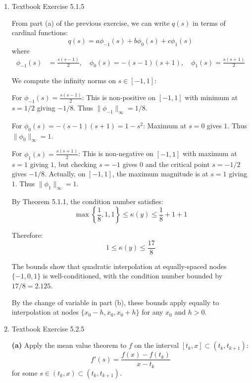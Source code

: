 \documentclass[reqno, answers]{exam}
\begin{document}
\begin{enumerate}
\begin{solution}
              Alternatively, in compact form:
              $$\tilde{q}(x) = \frac{(a-2b+c)(x-x_0)^2 + (c-a)h(x-x_0) + 2bh^2}{2h^2}$$
          \end{solution}

    \item Textbook Exercise 5.1.5
          \begin{solution}
              From part (a) of the previous exercise, we can write $q(s)$ in terms of cardinal functions:
              $$q(s) = a\phi_{-1}(s) + b\phi_0(s) + c\phi_1(s)$$
              where
              \begin{align*}
                  \phi_{-1}(s) & = \frac{s(s-1)}{2}, \quad \phi_0(s) = -(s-1)(s+1), \quad \phi_1(s) = \frac{s(s+1)}{2}
              \end{align*}

              We compute the infinity norms on $s \in [-1, 1]$:

              For $\phi_{-1}(s) = \frac{s(s-1)}{2}$: This is non-positive on $[-1,1]$ with minimum at $s=1/2$ giving $-1/8$. Thus $\|\phi_{-1}\|_\infty = 1/8$.

              For $\phi_0(s) = -(s-1)(s+1) = 1 - s^2$: Maximum at $s=0$ gives $1$. Thus $\|\phi_0\|_\infty = 1$.

              For $\phi_1(s) = \frac{s(s+1)}{2}$: This is non-negative on $[-1,1]$ with maximum at $s=1$ giving $1$, but checking $s=-1$ gives $0$ and the critical point $s=-1/2$ gives $-1/8$. Actually, on $[-1,1]$, the maximum magnitude is at $s=1$ giving $1$. Thus $\|\phi_1\|_\infty = 1$.

              By Theorem 5.1.1, the condition number satisfies:
              $$\max\left\{\frac{1}{8}, 1, 1\right\} \leq \kappa(y) \leq \frac{1}{8} + 1 + 1$$

              Therefore:
              $$1 \leq \kappa(y) \leq \frac{17}{8}$$

              The bounds show that quadratic interpolation at equally-spaced nodes $\{-1, 0, 1\}$ is well-conditioned, with the condition number bounded by $17/8 = 2.125$.

              By the change of variable in part (b), these bounds apply equally to interpolation at nodes $\{x_0-h, x_0, x_0+h\}$ for any $x_0$ and $h > 0$.
          \end{solution}

    \item Textbook Exercise 5.2.5

                    \begin{solution}
              \textbf{(a)} Apply the mean value theorem to $f$ on the interval $[t_k, x] \subset (t_k, t_{k+1})$:
              $$f'(s) = \frac{f(x) - f(t_k)}{x - t_k}$$
              for some $s \in (t_k, x) \subset (t_k, t_{k+1})$.


\end{solution}
\end{enumerate}
\end{document}
